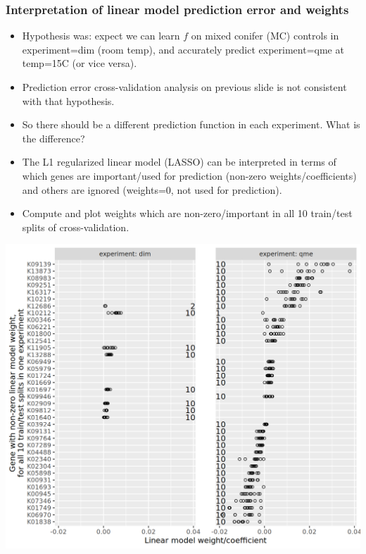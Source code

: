 \documentclass{beamer}
\begin{document}
\begin{frame}
    \frametitle{Interpretation of linear model prediction error and weights}
    \begin{itemize}
    \item Hypothesis was: expect we can learn $f$ on mixed conifer (MC) controls in experiment=dim (room temp), and accurately predict experiment=qme at temp=15C (or vice versa). 
    \item Prediction error cross-validation analysis on previous slide is not consistent with that hypothesis.
    \item So there should be a different prediction function in each
      experiment. What is the difference?
    \item The L1 regularized linear model (LASSO) can be interpreted
      in terms of which genes are important/used for prediction
      (non-zero weights/coefficients) and others are ignored
      (weights=0, not used for prediction).
    \item Compute and plot weights which are non-zero/important in all 10
      train/test splits of cross-validation.
    \end{itemize}
\end{frame}

\begin{frame}
  \includegraphics[width=\textwidth]{2024-01-09-qsip_pc2_all_new-controls.between.experiments.weights.png}
\end{frame}
\end{document}
